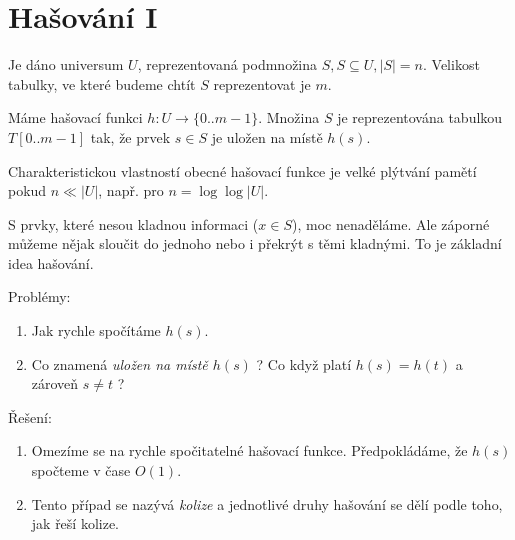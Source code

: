 
\def\prazdnatabulka{
\begin{tabular}{|l|l|}
\hline
& klíč\\
\hline
0& \\
1& \\
2& \\
3& \\
4& \\
5& \\
6& \\
7& \\
8& \\
9& \\
\hline
\end{tabular}
}

\chapter{Hašování I}

Je dáno universum $U$, reprezentovaná podmnožina $S, S \subseteq U, |S|=n$.
Velikost tabulky, ve které budeme chtít $S$ reprezentovat je $m$. 

Máme hašovací funkci $h: U \to \{0..m-1\}$. Množina $S$ je
reprezentována tabulkou $T[0..m-1]$ tak, že prvek $s \in S$ je uložen na
místě $h(s)$.

Charakteristickou vlastností obecné hašovací funkce je velké plýtvání 
pamětí pokud $n \ll |U|$, např. pro $n = \log\log |U|$.

S prvky, které nesou kladnou informaci ($x \in S$), moc
nenaděláme. Ale záporné můžeme nějak sloučit do jednoho nebo i
překrýt s těmi kladnými. To je základní idea hašování.


Problémy:
\begin{enumerate}
\item Jak rychle spočítáme $h(s)$.
\item Co znamená {\em uložen na místě $h(s)$} ? Co když platí $h(s)=h(t)$
a zároveň $s \ne t$ ?
\end{enumerate}

Řešení:
\begin{enumerate}
\item Omezíme se na rychle spočitatelné hašovací
funkce. Předpokládáme, že $h(s)$ spočteme v čase $O(1)$.
\item Tento případ se nazývá {\em kolize} a jednotlivé druhy hašování
se dělí podle toho, jak řeší kolize.
\end{enumerate}

